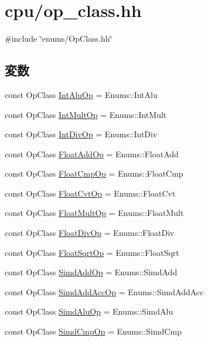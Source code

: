 \hypertarget{op__class_8hh}{
\section{cpu/op\_\-class.hh}
\label{op__class_8hh}
}
{\ttfamily \#include \char`\"{}enums/OpClass.hh\char`\"{}}\par
\subsection*{変数}
\begin{DoxyCompactItemize}
\item 
const OpClass \hyperlink{op__class_8hh_a57ffe59bbef6b948752d3b5086a33af9}{IntAluOp} = Enums::IntAlu
\item 
const OpClass \hyperlink{op__class_8hh_ae50ef4669f1d2743a6a3f6a104817cbc}{IntMultOp} = Enums::IntMult
\item 
const OpClass \hyperlink{op__class_8hh_a303ec67a6fe8b9a36513930abda060dd}{IntDivOp} = Enums::IntDiv
\item 
const OpClass \hyperlink{op__class_8hh_a32831421adb59741322fa8e7cf58f94b}{FloatAddOp} = Enums::FloatAdd
\item 
const OpClass \hyperlink{op__class_8hh_ab35872dfd10381e872167d73647309a3}{FloatCmpOp} = Enums::FloatCmp
\item 
const OpClass \hyperlink{op__class_8hh_a928aacdcb8745a6a37db05b7ddbf5ff4}{FloatCvtOp} = Enums::FloatCvt
\item 
const OpClass \hyperlink{op__class_8hh_aba45bb951b34e95a4ae2eda19d8d78ea}{FloatMultOp} = Enums::FloatMult
\item 
const OpClass \hyperlink{op__class_8hh_aefe3c3e61a9937f10eedfea4e768e2f6}{FloatDivOp} = Enums::FloatDiv
\item 
const OpClass \hyperlink{op__class_8hh_a1354cf7bc378478ac49aecb2af3f8132}{FloatSqrtOp} = Enums::FloatSqrt
\item 
const OpClass \hyperlink{op__class_8hh_a51335c0e8449d014a427823c0a408834}{SimdAddOp} = Enums::SimdAdd
\item 
const OpClass \hyperlink{op__class_8hh_aafe77005165f9045b7b7bf43400de080}{SimdAddAccOp} = Enums::SimdAddAcc
\item 
const OpClass \hyperlink{op__class_8hh_a8e6e42ad37a2d396f3a64e233a31660e}{SimdAluOp} = Enums::SimdAlu
\item 
const OpClass \hyperlink{op__class_8hh_a0c6df51ab6734480ccc23de38ee1f2c1}{SimdCmpOp} = Enums::SimdCmp
\item 

\end{DoxyCompactItemize}
